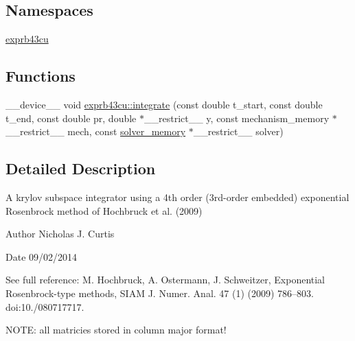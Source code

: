 \subsection*{Namespaces}
\begin{DoxyCompactItemize}
\item 
 \hyperlink{namespaceexprb43cu}{exprb43cu}
\end{DoxyCompactItemize}
\subsection*{Functions}
\begin{DoxyCompactItemize}
\item 
\+\_\+\+\_\+device\+\_\+\+\_\+ void \hyperlink{namespaceexprb43cu_ad98c42138e12fe026951999e87b1ceb4}{exprb43cu\+::integrate} (const double t\+\_\+start, const double t\+\_\+end, const double pr, double $\ast$\+\_\+\+\_\+restrict\+\_\+\+\_\+ y, const mechanism\+\_\+memory $\ast$\+\_\+\+\_\+restrict\+\_\+\+\_\+ mech, const \hyperlink{structsolver__memory}{solver\+\_\+memory} $\ast$\+\_\+\+\_\+restrict\+\_\+\+\_\+ solver)
\end{DoxyCompactItemize}


\subsection{Detailed Description}
A krylov subspace integrator using a 4th order (3rd-\/order embedded) exponential Rosenbrock method of Hochbruck et al. (2009) 

\begin{DoxyAuthor}{Author}
Nicholas J. Curtis 
\end{DoxyAuthor}
\begin{DoxyDate}{Date}
09/02/2014
\end{DoxyDate}
See full reference\+: M. Hochbruck, A. Ostermann, J. Schweitzer, Exponential Rosenbrock-\/type methods, S\+I\+AM J. Numer. Anal. 47 (1) (2009) 786–803. doi\+:10./080717717.

N\+O\+TE\+: all matricies stored in column major format! 
